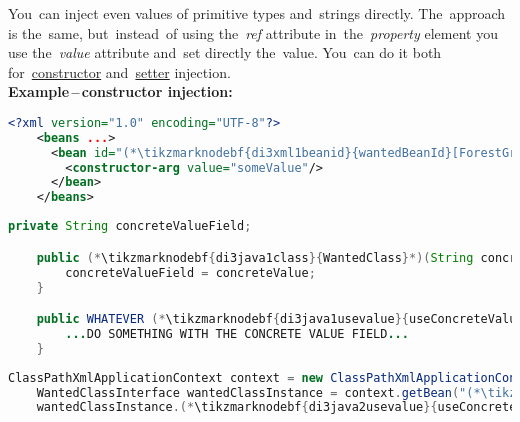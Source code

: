 \label{injectingliteralvalues}
You~can inject even values of primitive types and~strings directly. The~approach is the~same, but~instead~of using the~\textit{ref} attribute in~the~\textit{property} element you use the~\textit{value} attribute and~set directly the~value. You~can do it both for~\hyperref[constructorinjection]{constructor} and~\hyperref[setterinjection]{setter} injection.\\

\vspace{\baselineskip}
\noindent \textbf{Example\,--\,constructor injection:}
\begin{lstlisting}[language=XML, title={Configuration XML}]
    <?xml version="1.0" encoding="UTF-8"?>
    <beans ...>
      <bean id="(*\tikzmarknodebf{di3xml1beanid}{wantedBeanId}[ForestGreen]*)" class="package.subfolder.(*\tikzmarknodebf{di3xml1class}{WantedClass}[ForestGreen]*)">
        <constructor-arg value="someValue"/>
      </bean>
    </beans>
\end{lstlisting}
\begin{lstlisting}[language=Java, title={Wanted class with the constructor}]
    private String concreteValueField;

    public (*\tikzmarknodebf{di3java1class}{WantedClass}*)(String concreteValue) {
        concreteValueField = concreteValue;
    }

    public WHATEVER (*\tikzmarknodebf{di3java1usevalue}{useConcreteValue}*)() {
        ...DO SOMETHING WITH THE CONCRETE VALUE FIELD...
    }
\end{lstlisting}
\begin{lstlisting}[language=Java, title={Usage}]
    ClassPathXmlApplicationContext context = new ClassPathXmlApplicationContext("configurationFile.xml");
    WantedClassInterface wantedClassInstance = context.getBean("(*\tikzmarknodebf{di3java2beanid}{wantedBeanId}[ForestGreen]*)", WantedClassInterface.class);
    wantedClassInstance.(*\tikzmarknodebf{di3java2usevalue}{useConcreteValue}*)();
\end{lstlisting}
\newpage

